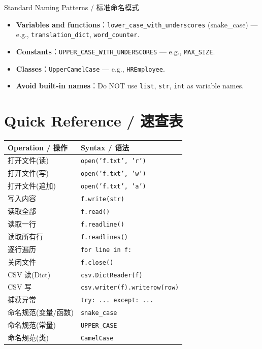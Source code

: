 \documentclass[11pt,a4paper]{report}
\let\oldtexttt\texttt
\renewcommand{\texttt}[1]{\textcolor{mainblue}{\oldtexttt{#1}}}
\begin{document}
\begin{concept}{Standard Naming Patterns / 标准命名模式}
    \begin{itemize}[itemsep=0.5em]
        \item \textbf{Variables and functions}：\texttt{lower\_case\_with\_underscores} (snake\_case) — e.g., \texttt{translation\_dict}, \texttt{word\_counter}.
        \item \textbf{Constants}：\texttt{UPPER\_CASE\_WITH\_UNDERSCORES} — e.g., \texttt{MAX\_SIZE}.
        \item \textbf{Classes}：\texttt{UpperCamelCase} — e.g., \texttt{HREmployee}.
        \item \textbf{Avoid built-in names}：Do NOT use \texttt{list}, \texttt{str}, \texttt{int} as variable names.
    \end{itemize}
\end{concept}

\section{Quick Reference / 速查表}

\medskip
\centering
\small
\renewcommand{\arraystretch}{1.3}
\begin{tabular}{@{}ll@{}}
\toprule
\textbf{Operation / 操作} & \textbf{Syntax / 语法} \\ \midrule
打开文件(读) & \texttt{open('f.txt', 'r')} \\
打开文件(写) & \texttt{open('f.txt', 'w')} \\
打开文件(追加) & \texttt{open('f.txt', 'a')} \\
写入内容 & \texttt{f.write(str)} \\
读取全部 & \texttt{f.read()} \\
读取一行 & \texttt{f.readline()} \\
读取所有行 & \texttt{f.readlines()} \\
逐行遍历 & \texttt{for line in f:} \\
关闭文件 & \texttt{f.close()} \\
CSV 读(Dict) & \texttt{csv.DictReader(f)} \\
CSV 写 & \texttt{csv.writer(f).writerow(row)} \\
捕获异常 & \texttt{try: ... except: ...} \\
命名规范(变量/函数) & \texttt{snake\_case} \\
命名规范(常量) & \texttt{UPPER\_CASE} \\
命名规范(类) & \texttt{CamelCase} \\ \bottomrule
\end{tabular}
\medskip
\end{document}
